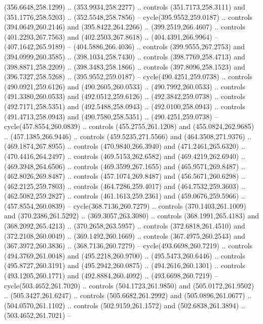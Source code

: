 \begin{scope}[cm={{1.25,0.0,0.0,-1.25,(0.0,743.43331)}}]
    (356.6648,258.1299) .. (353.9934,258.2277) .. controls (351.7173,258.3111) and
    (351.1776,258.5203) .. (352.5548,258.7856) -- cycle(395.9552,259.0187) ..
    controls (394.0649,260.2146) and (395.8422,264.2266) .. (399.2519,266.4607) ..
    controls (401.2293,267.7563) and (402.2503,267.8618) .. (404.4391,266.9964) --
    (407.1642,265.9189) -- (404.5886,266.4036) .. controls (399.9555,267.2753) and
    (394.0999,260.3585) .. (398.1034,258.7430) .. controls (398.7769,258.4713) and
    (398.8871,258.2209) .. (398.3483,258.1866) .. controls (397.8096,258.1523) and
    (396.7327,258.5268) .. (395.9552,259.0187) -- cycle(490.4251,259.0738) ..
    controls (490.0921,259.6126) and (490.2605,260.0533) .. (490.7992,260.0533) ..
    controls (491.3380,260.0533) and (492.0512,259.6126) .. (492.3842,259.0738) ..
    controls (492.7171,258.5351) and (492.5488,258.0943) .. (492.0100,258.0943) ..
    controls (491.4713,258.0943) and (490.7580,258.5351) .. (490.4251,259.0738) --
    cycle(457.8554,260.0839) .. controls (455.2755,261.1208) and
    (455.0824,262.9685) .. (457.1385,266.9446) .. controls (459.5235,271.5566) and
    (464.3508,271.9376) .. (469.1874,267.8955) .. controls (470.9840,266.3940) and
    (471.2461,265.6320) .. (470.4416,264.2497) .. controls (469.5153,262.6582) and
    (469.4219,262.6940) .. (469.3948,264.6506) .. controls (469.3599,267.1655) and
    (465.9571,269.8487) .. (462.8026,269.8487) .. controls (457.1074,269.8487) and
    (456.5671,260.6298) .. (462.2125,259.7803) .. controls (464.7286,259.4017) and
    (464.7532,259.3603) .. (462.5082,259.2827) .. controls (461.1613,259.2361) and
    (459.0676,259.5966) .. (457.8554,260.0839) -- cycle(368.7136,260.7279) ..
    controls (370.1403,261.1009) and (370.2386,261.5292) .. (369.3057,263.3080) ..
    controls (368.1991,265.4183) and (368.2092,265.4213) .. (370.2658,263.5957) ..
    controls (372.6818,261.4510) and (372.2108,260.0049) .. (369.1492,260.1669) ..
    controls (367.4975,260.2543) and (367.3972,260.3836) .. (368.7136,260.7279) --
    cycle(493.6698,260.7219) .. controls (494.3769,261.0048) and
    (495.2218,260.9700) .. (495.5473,260.6446) .. controls (495.8727,260.3191) and
    (495.2942,260.0875) .. (494.2616,260.1301) .. controls (493.1205,260.1771) and
    (492.8884,260.4092) .. (493.6698,260.7219) -- cycle(503.4652,261.7020) ..
    controls (504.1723,261.9850) and (505.0172,261.9502) .. (505.3427,261.6247) ..
    controls (505.6682,261.2992) and (505.0896,261.0677) .. (504.0570,261.1102) ..
    controls (502.9159,261.1572) and (502.6838,261.3894) .. (503.4652,261.7021) --

\end{scope}
